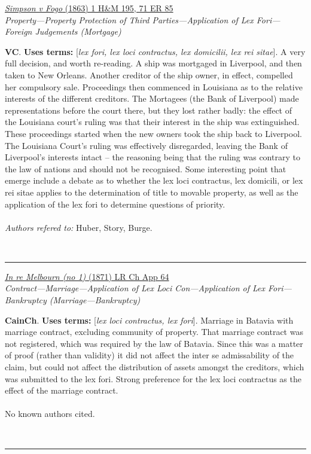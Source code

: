 \documentclass[twoside]{article}
\begin{document}
        \begin{small}
        \begin{center}
        \href{https://heinonline.org/HOL/P?h=hein.engrep/engre0071&i=91}{\textit{Simpson v Fogo} (1863) 1 H\&M 195, 71 ER 85} \label{117} \\ 
\textit{Property---Property Protection of Third Parties---Application of Lex Fori---Foreign Judgements (Mortgage)}\\
        \end{center}
        \textbf{VC}.  \textbf{Uses terms: }[\textit{lex fori, lex loci contractus, lex domicilii, lex rei sitae}]. A very full decision, and worth re-reading. A ship was mortgaged in Liverpool, and then taken to New Orleans. Another creditor of the ship owner, in effect, compelled her compulsory sale. Proceedings then commenced in Louisiana as to the relative interests of the different creditors. The Mortagees (the Bank of Liverpool) made representations before the court there, but they lost rather badly: the effect of the Louisiana court’s ruling was that their interest in the ship was extinguished. These proceedings started when the new owners took the ship back to Liverpool. The Louisiana Court’s ruling was effectively disregarded, leaving the Bank of Liverpool’s interests intact – the reasoning being that the ruling was contrary to the law of nations and should not be recognised. Some interesting point that emerge include a debate as to whether the lex loci contractus, lex domicili, or lex rei sitae applies to the determination of title to movable property, as well as the application of the lex fori to determine questions of priority.\\\\\textit{Authors refered to: }Huber, Story, Burge.
        \end{small}\\
        \rule{\textwidth}{0.5pt}
        

        \begin{small}
        \begin{center}
        \href{None}{\textit{In re Melbourn (no 1)} (1871) LR Ch App 64} \label{119} \\ 
\textit{Contract---Marriage---Application of Lex Loci Con---Application of Lex Fori---Bankruptcy (Marriage---Bankruptcy)}\\
        \end{center}
        \textbf{CainCh}.  \textbf{Uses terms: }[\textit{lex loci contractus, lex fori}]. Marriage in Batavia with marriage contract, excluding community of property. That marriage contract was not registered, which was required by the law of Batavia. Since this was a matter of proof (rather than validity) it did not affect the inter se admissability of the claim, but could not affect the distribution of assets amongst the creditors, which was submitted to the lex fori. Strong preference for the lex loci contractus as the effect of the marriage contract.\\\\No known authors cited.
        \end{small}\\
        \rule{\textwidth}{0.5pt}
        
\end{document}

